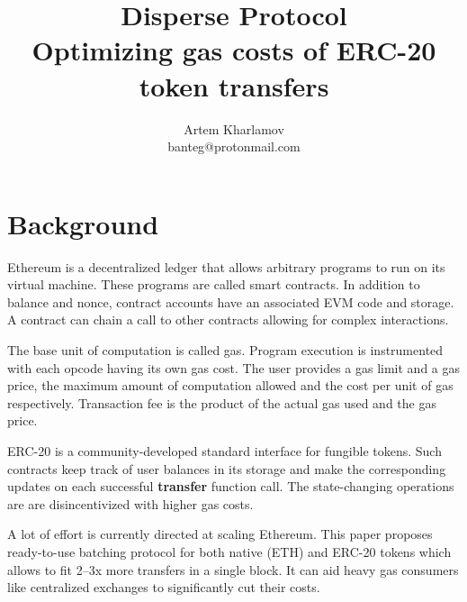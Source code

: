 \documentclass[12pt]{article}
\begin{document}
\title{
	Disperse Protocol\\
	\Large{Optimizing gas costs of ERC-20 token transfers}
}
\author{Artem Kharlamov \\ \small{banteg@protonmail.com}}

\maketitle
{}

\section{Background}
Ethereum is a decentralized ledger that allows arbitrary programs to run on its virtual machine.
These programs are called smart contracts.
In addition to balance and nonce, contract accounts have an associated EVM code and storage.
A contract can chain a call to other contracts allowing for complex interactions.\cite{ethereum}

The base unit of computation is called gas.
Program execution is instrumented with each opcode having its own gas cost.
The user provides a gas limit and a gas price, the maximum amount of computation allowed and the cost per unit of gas respectively.
Transaction fee is the product of the actual gas used and the gas price.

ERC-20 is a community-developed standard interface for fungible tokens\cite{eip20}.
Such contracts keep track of user balances in its storage and make the corresponding updates on each successful \textbf{transfer} function call.
The state-changing operations are are disincentivized with higher gas costs.

A lot of effort is currently directed at scaling Ethereum.
This paper proposes ready-to-use batching protocol for both native (ETH) and ERC-20 tokens which allows to fit 2--3x more transfers in a single block.
It can aid heavy gas consumers like centralized exchanges to significantly cut their costs.
\end{document}
